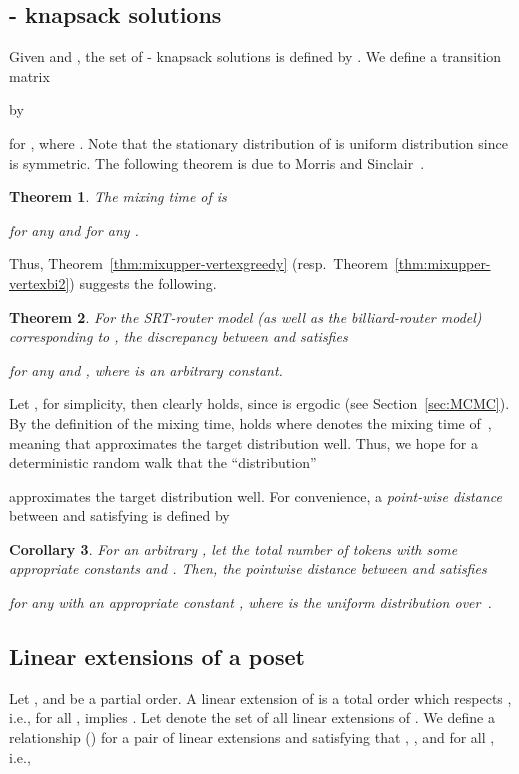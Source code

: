 \documentclass[letter, 11pt]{article}
\newcommand{\1}{\mbox{1}\hspace{-0.25em}\mbox{l}}
\newtheorem{theorem}{Theorem}[section]
\newtheorem{corollary}[theorem]{Corollary}
\begin{document}
\subsection{- knapsack solutions}\label{sec:knapsack}
Given  and , 
  the set of  - knapsack solutions is defined by 
  . 
 We define a transition matrix 
    
  by

for , where . 
Note that the stationary distribution of  is uniform distribution since  is symmetric. 
The following theorem is due to Morris and Sinclair~\cite{MS04}. 
\begin{theorem}
\label{thm:knapsackmix}
\cite{MS04}
 The mixing time  of  is 

for any  and for any . 
\end{theorem}



 Thus, Theorem~\ref{thm:mixupper-vertexgreedy} (resp.\ Theorem~\ref{thm:mixupper-vertexbi2}) suggests the following. 
\begin{theorem}\label{thm:knapsackupper}
For the SRT-router model (as well as the billiard-router model) corresponding to , 
 the discrepancy between  and  satisfies

for any  and , where  is an arbitrary constant. 
\end{theorem}


 Let  , for simplicity, 
  then clearly  holds, 
  since  is ergodic (see Section~\ref{sec:MCMC}).  
 By the definition of the mixing time, 
   holds 
 where  denotes the mixing time of~, 
 meaning that  approximates the target distribution  well. 
 Thus, we hope for a deterministic random walk 
  that the ``distribution'' 
   
  approximates the target distribution  well. 
For convenience, 
  a {\em point-wise distance}  
   between  and  satisfying  
  is defined by 



\begin{corollary}
 For an arbitrary  , 
  let the total number of tokens  
   with some appropriate constants  and . 
 Then, 
  the pointwise distance between  and  satisfies

 for any  
   with an appropriate constant , 
 where  is the uniform distribution over~. 
\end{corollary}


\subsection{Linear extensions of a poset}\label{sec:linear_extensions}
Let , and  be a partial order. 
A linear extension of  is a total order  which respects , 
i.e., for all ,  implies . 
Let  denote the set of all linear extensions of . 
We define a relationship  () 
  for a pair of linear extensions  and   
  satisfying that , , and  for all , 
 i.e., 
\end{document}

